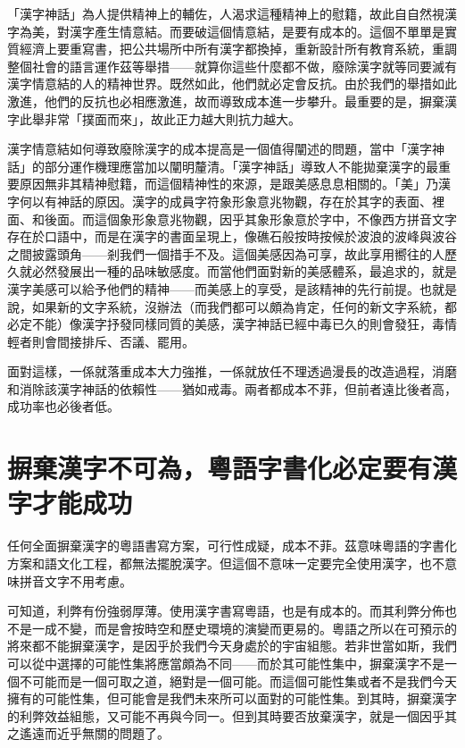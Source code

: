 \documentclass[a5paper, 12pt, openany]{book} %
\begin{document}
「漢字神話」為人提供精神上的輔佐，人渴求這種精神上的慰籍，故此自自然視漢字為美，對漢字產生情意結。而要破這個情意結，是要有成本的。這個不單單是實質經濟上要重寫書，把公共場所中所有漢字都換掉，重新設計所有教育系統，重調整個社會的語言運作茲等舉措——就算你這些什麼都不做，廢除漢字就等同要滅有漢字情意結的人的精神世界。既然如此，他們就必定會反抗。由於我們的舉措如此激進，他們的反抗也必相應激進，故而導致成本進一步攀升。最重要的是，摒棄漢字此舉非常「撲面而來」，故此正力越大則抗力越大。

漢字情意結如何導致廢除漢字的成本提高是一個值得闡述的問題，當中「漢字神話」的部分運作機理應當加以闡明釐清。「漢字神話」導致人不能拋棄漢字的最重要原因無非其精神慰籍，而這個精神性的來源，是跟美感息息相關的。「美」乃漢字何以有神話的原因。漢字的成員字符象形象意兆物觀，存在於其字的表面、裡面、和後面。而這個象形象意兆物觀，因乎其象形象意於字中，不像西方拼音文字存在於口語中，而是在漢字的書面呈現上，像礁石般按時按候於波浪的波峰與波谷之間披露頭角——剎我們一個措手不及。這個美感因為可享，故此享用嚮往的人歷久就必然發展出一種的品味敏感度。而當他們面對新的美感體系，最追求的，就是漢字美感可以給予他們的精神——而美感上的享受，是該精神的先行前提。也就是說，如果新的文字系統，沒辦法（而我們都可以頗為肯定，任何的新文字系統，都必定不能）像漢字抒發同樣同質的美感，漢字神話已經中毒已久的則會發狂，毒情輕者則會間接排斥、否議、罷用。

面對這樣，一係就落重成本大力強推，一係就放任不理透過漫長的改造過程，消磨和消除該漢字神話的依賴性——猶如戒毒。兩者都成本不菲，但前者遠比後者高，成功率也必後者低。

\section{摒棄漢字不可為，粵語字書化必定要有漢字才能成功}

任何全面摒棄漢字的粵語書寫方案，可行性成疑，成本不菲。茲意味粵語的字書化方案和語文化工程，都無法擺脫漢字。但這個不意味一定要完全使用漢字，也不意味拼音文字不用考慮。

可知道，利弊有份強弱厚薄。使用漢字書寫粵語，也是有成本的。而其利弊分佈也不是一成不變，而是會按時空和歷史環境的演變而更易的。粵語之所以在可預示的將來都不能摒棄漢字，是因乎於我們今天身處於的宇宙組態。若非世當如斯，我們可以從中選擇的可能性集將應當頗為不同——而於其可能性集中，摒棄漢字不是一個不可能而是一個可取之道，絕對是一個可能。而這個可能性集或者不是我們今天擁有的可能性集，但可能會是我們未來所可以面對的可能性集。到其時，摒棄漢字的利弊效益組態，又可能不再與今同一。但到其時要否放棄漢字，就是一個因乎其之遙遠而近乎無關的問題了。
\end{document}
